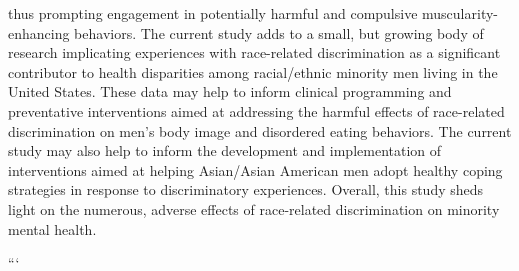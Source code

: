 \documentclass[
  12pt,
]{article}
\begin{document}
thus prompting engagement in potentially harmful and compulsive
muscularity-enhancing behaviors. The current study adds to a small, but
growing body of research implicating experiences with race-related
discrimination as a significant contributor to health disparities among
racial/ethnic minority men living in the United States. These data may
help to inform clinical programming and preventative interventions aimed
at addressing the harmful effects of race-related discrimination on
men's body image and disordered eating behaviors. The current study may
also help to inform the development and implementation of interventions
aimed at helping Asian/Asian American men adopt healthy coping
strategies in response to discriminatory experiences. Overall, this
study sheds light on the numerous, adverse effects of race-related
discrimination on minority mental health.

```
\end{document}

